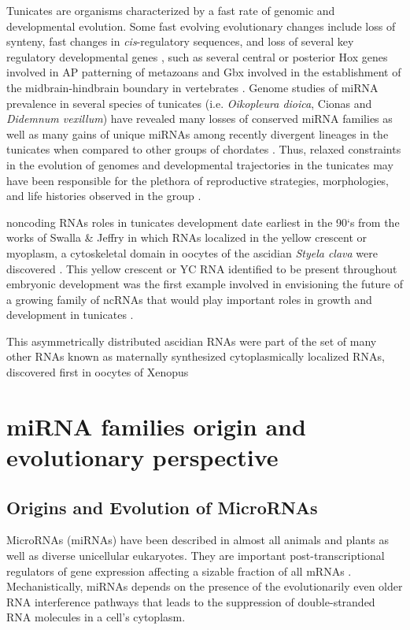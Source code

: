 \documentclass[graybox]{svmult}
\begin{document}
Tunicates are organisms characterized by a fast rate of genomic and 
developmental evolution. Some fast evolving evolutionary changes include loss 
of synteny, fast changes in \textit{cis}-regulatory sequences, and loss of 
several key regulatory developmental genes \cite{Satou2008, Denoeud1381}, such 
as several central or posterior Hox genes involved in AP patterning 
of metazoans \cite{Ikuta:2005} and Gbx involved in the establishment of 
the midbrain-hindbrain boundary in vertebrates \cite{Yagi2003}. Genome 
studies of miRNA prevalence in several species of tunicates (i.e. 
\textit{Oikopleura dioica}, Cionas and \textit{Didemnum vexillum}) have 
revealed many losses of conserved miRNA families as well as many gains of 
unique miRNAs among recently divergent lineages in the tunicates when compared 
to other groups of chordates \cite{Fu2008, Velandia-Huerto2016}. Thus, relaxed 
constraints in the evolution of genomes and developmental trajectories in the 
tunicates may have been responsible for the plethora of reproductive strategies, 
morphologies, and life histories observed in the group \cite{Holland2015}.

noncoding RNAs roles in tunicates development date earliest in the 90`s from 
the works of Swalla \& Jeffry in which RNAs localized in the yellow crescent or 
myoplasm, a cytoskeletal domain in oocytes of the ascidian \textit{Styela clava} 
were discovered \cite{Swalla1995}. This yellow crescent or YC RNA identified to 
be present throughout embryonic development was the first example involved in 
envisioning the future of a growing family of ncRNAs that would play important 
roles in growth and development in tunicates \cite{Swalla1995}.

This asymmetrically distributed ascidian RNAs were part of the set of many 
other RNAs known as maternally synthesized cytoplasmically localized RNAs, 
discovered first in oocytes of Xenopus \cite{Bashirullah1998}

\section{miRNA families origin and evolutionary perspective}
\label{sec:2}

\subsection{Origins and Evolution of MicroRNAs}

MicroRNAs (miRNAs) have been described in almost all animals and plants as
well as diverse unicellular eukaryotes. They are important
post-transcriptional regulators of gene expression affecting a sizable
fraction of all mRNAs \cite{Ameres:13}. Mechanistically, miRNAs depends on
the presence of the evolutionarily even older RNA interference pathways
\cite{Cerutti:06, Shabalina:08} that leads to the suppression of
double-stranded RNA molecules in a cell's cytoplasm. 
\end{document}
